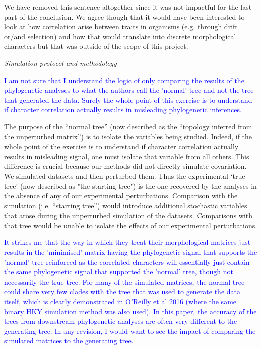\documentclass[12pt,letterpaper]{article}
\renewcommand{\subsection}[1]{%
\bigskip
\begin{center}
\begin{large}
\normalfont\itshape #1
\end{large}
\end{center}}
\begin{document}
We have removed this sentence altogether since it was not impactful for the last part of the conclusion. We agree though that it would have been interested to look at how correlation arise between traits in organisms (e.g. through drift or/and selection) and how that would translate into discrete morphological characters but that was outside of the scope of this project.


\subsection{Simulation protocol and methodology}

\textcolor{blue}{I am not sure that I understand the logic of only comparing the results of the phylogenetic analyses to what the authors call the 'normal' tree and not the tree that generated the data. Surely the whole point of this exercise is to understand if character correlation actually results in misleading phylogenetic inferences.}

The purpose of the “normal tree” (now described as the ``topology inferred from the unperturbed matrix'') is to isolate the variables being studied. Indeed, if the whole point of the exercise is to understand if character correlation actually results in misleading signal, one must isolate that variable from all others. This difference is crucial because our methods did not directly simulate covariation. We simulated datasets and then perturbed them. Thus the experimental ‘true tree’ (now described as "the starting tree") is the one recovered by the analyses in the absence of any of our experimental perturbations. Comparison with the simulation (i.e. “starting tree”) would introduce additional stochastic variables that arose during the unperturbed simulation of the datasets. Comparisons with that tree would be unable to isolate the effects of our experimental perturbations.



\textcolor{blue}{It strikes me that the way in which they treat their morphological matrices just results in the 'minimised' matrix having the phylogenetic signal that supports the 'normal' tree reinforced as the correlated characters will essentially just contain the same phylogenetic signal that supported the 'normal' tree, though not necessarily the true tree.  For many of the simulated matrices, the normal tree could share very few clades with the tree that was used to generate the data itself, which is clearly demonstrated in O'Reilly et al 2016 (where the same binary HKY simulation method was also used). In this paper, the accuracy of the trees from downstream phylogenetic analyses are often very different to the generating tree. In any revision, I would want to see the impact of comparing the simulated matrices to the generating tree.}
\end{document}
